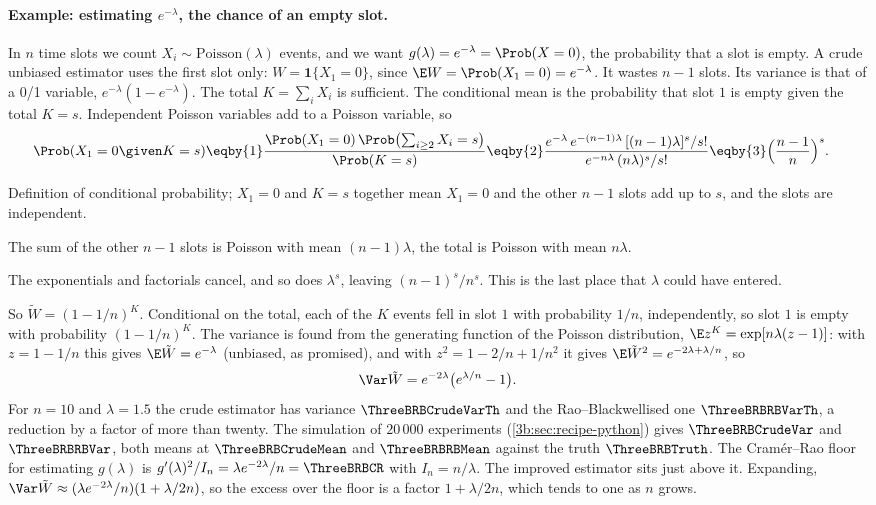 \paragraph{Example: estimating $e^{-\lambda}$, the chance of an empty slot.}
In $n$ time slots we count $X_i\sim\mathrm{Poisson}(\lambda)$ events, and we
want $g(\lambda)=e^{-\lambda}=\Prob(X=0)$, the probability that a slot is
empty. A crude unbiased estimator uses the first slot only:
$W=\mathbf 1\{X_1=0\}$, since $\E W=\Prob(X_1=0)=e^{-\lambda}$. It wastes
$n-1$ slots. Its variance is that of a 0/1 variable, $e^{-\lambda}(1-e^{-\lambda})$.
The total $K=\sum_iX_i$ is sufficient. The conditional mean is the
probability that slot $1$ is empty given the total $K=s$. Independent
Poisson variables add to a Poisson variable, so
\begin{align}
  \Prob(X_1=0\given K=s)
  &\eqby{1}\frac{\Prob(X_1=0)\,\Prob\bigl(\sum_{i\ge2}X_i=s\bigr)}{\Prob(K=s)}
   \eqby{2}\frac{e^{-\lambda}\,e^{-(n-1)\lambda}\,[(n-1)\lambda]^s/s!}{e^{-n\lambda}\,(n\lambda)^s/s!}
   \eqby{3}\Bigl(\frac{n-1}{n}\Bigr)^{s} .
  \label{3b:eq:rb-poisson}
\end{align}
\begin{explain}
  \item Definition of conditional probability; $X_1=0$ and $K=s$ together mean
        $X_1=0$ and the other $n-1$ slots add up to $s$, and the slots are independent.
  \item The sum of the other $n-1$ slots is Poisson with mean $(n-1)\lambda$,
        the total is Poisson with mean $n\lambda$.
  \item The exponentials and factorials cancel, and so does $\lambda^s$, leaving
        $(n-1)^s/n^s$. This is the last place that $\lambda$ could have entered.
\end{explain}
So $\tilde W=(1-1/n)^K$. Conditional on the total, each of the $K$ events
fell in slot $1$ with probability $1/n$, independently, so slot $1$ is
empty with probability $(1-1/n)^K$. The variance is found from the
generating function of the Poisson distribution, $\E z^K=\exp[n\lambda(z-1)]$:
with $z=1-1/n$ this gives $\E\tilde W=e^{-\lambda}$ (unbiased, as promised),
and with $z^2=1-2/n+1/n^2$ it gives $\E\tilde W^2=e^{-2\lambda+\lambda/n}$, so
\[
  \Var\tilde W=e^{-2\lambda}\bigl(e^{\lambda/n}-1\bigr) .
\]
For $n=10$ and $\lambda=1.5$ the crude estimator has variance
$\ThreeBRBCrudeVarTh$ and the Rao--Blackwellised one $\ThreeBRBRBVarTh$, a
reduction by a factor of more than twenty. The simulation of
$20\,000$ experiments (\cref{3b:sec:recipe-python}) gives $\ThreeBRBCrudeVar$ and
$\ThreeBRBRBVar$, both means at $\ThreeBRBCrudeMean$ and $\ThreeBRBRBMean$
against the truth $\ThreeBRBTruth$. The Cram\'er--Rao floor for estimating
$g(\lambda)$ is $g'(\lambda)^2/I_n=\lambda e^{-2\lambda}/n=\ThreeBRBCR$ with
$I_n=n/\lambda$. The improved estimator sits just above it. Expanding,
$\Var\tilde W\approx(\lambda e^{-2\lambda}/n)(1+\lambda/2n)$, so the excess
over the floor is a factor $1+\lambda/2n$, which tends to one as $n$ grows.

